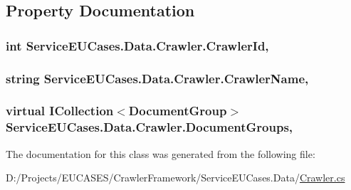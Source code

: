 \subsection{Property Documentation}
\hypertarget{class_service_e_u_cases_1_1_data_1_1_crawler_a5ba52c444533e019eef644789dcea470}{
\subsubsection[{Crawler\-Id}]{\setlength{\rightskip}{0pt plus 5cm}int Service\-E\-U\-Cases.\-Data.\-Crawler.\-Crawler\-Id\hspace{0.3cm}{\ttfamily [get]}, {\ttfamily [set]}}}\label{class_service_e_u_cases_1_1_data_1_1_crawler_a5ba52c444533e019eef644789dcea470}
\hypertarget{class_service_e_u_cases_1_1_data_1_1_crawler_ad9ec3cf9ebc10958d2c7c10e8ca719b2}{
\subsubsection[{Crawler\-Name}]{\setlength{\rightskip}{0pt plus 5cm}string Service\-E\-U\-Cases.\-Data.\-Crawler.\-Crawler\-Name\hspace{0.3cm}{\ttfamily [get]}, {\ttfamily [set]}}}\label{class_service_e_u_cases_1_1_data_1_1_crawler_ad9ec3cf9ebc10958d2c7c10e8ca719b2}
\hypertarget{class_service_e_u_cases_1_1_data_1_1_crawler_aee7b9601156c05b729562525648e063b}{
\subsubsection[{Document\-Groups}]{\setlength{\rightskip}{0pt plus 5cm}virtual I\-Collection$<${\bf Document\-Group}$>$ Service\-E\-U\-Cases.\-Data.\-Crawler.\-Document\-Groups\hspace{0.3cm}{\ttfamily [get]}, {\ttfamily [set]}}}\label{class_service_e_u_cases_1_1_data_1_1_crawler_aee7b9601156c05b729562525648e063b}


The documentation for this class was generated from the following file\-:\begin{DoxyCompactItemize}
\item 
D\-:/\-Projects/\-E\-U\-C\-A\-S\-E\-S/\-Crawler\-Framework/\-Service\-E\-U\-Cases.\-Data/\hyperlink{_crawler_8cs}{Crawler.\-cs}\end{DoxyCompactItemize}
